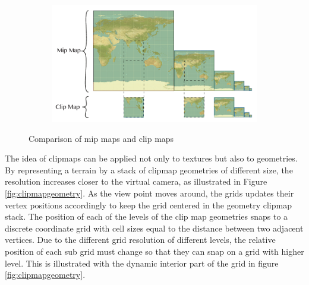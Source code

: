 \begin{figure}[htbp]
    \centering
    \begin{subfigure}[bt]{0.8\textwidth}
        \includegraphics[width=\textwidth]{figures/geometryclipmap/clipmap_mipmap.pdf}
    \end{subfigure}
    \caption{Comparison of mip maps and clip maps}
    \label{fig:clipmapmipmap}
\end{figure}

The idea of clipmaps can be applied not only to textures but also to geometries. By representing a terrain by a stack of clipmap geometries of different size, the resolution increases closer to the virtual camera, as illustrated in Figure \ref{fig:clipmapgeometry}. As the view point moves around, the grids updates their vertex positions accordingly to keep the grid centered in the geometry clipmap stack. The position of each of the levels of the clip map geometries snaps to a discrete coordinate grid with cell sizes equal to the distance between two adjacent vertices. Due to the different grid resolution of different levels, the relative position of each sub grid must change so that they can snap on a grid with higher level. This is illustrated with the dynamic interior part of the grid in figure \ref{fig:clipmapgeometry}.

